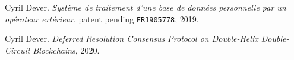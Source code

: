 \documentclass[twoside,twocolumn]{article}
\theoremstyle{definition}
\theoremstyle{remark}
\begin{document}


\begin{thebibliography}{99} %

Cyril Dever. \emph{Système de traitement d'une base de données personnelle par un opérateur extérieur}, patent pending \texttt{FR1905778}, 2019.

Cyril Dever. \emph{Deferred Resolution Consensus Protocol on Double-Helix Double-Circuit Blockchains}, 2020.

\end{thebibliography}

\end{document}
